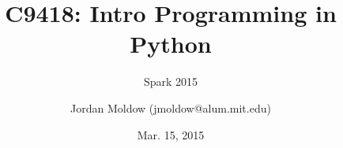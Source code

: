 \usepackage[english]{babel}

\usepackage[latin1]{inputenc}

\usepackage{times}
\usepackage[T1]{fontenc}
\usepackage{amsmath,amssymb,amsfonts}

\usepackage{textcomp, inputenc}
\renewcommand{\ttdefault}{pcr}

\renewcommand{\subject}{C9418: Intro Programming in Python}
\title %
{\subject}


\subtitle
{%
  Spark 2015%
}

\author %
{Jordan Moldow ({\ttfamily jmoldow@alum.mit.edu})
}


\date %
{Mar. 15, 2015}













\maketitle
\begin{frame}
  \titlepage
\end{frame}

